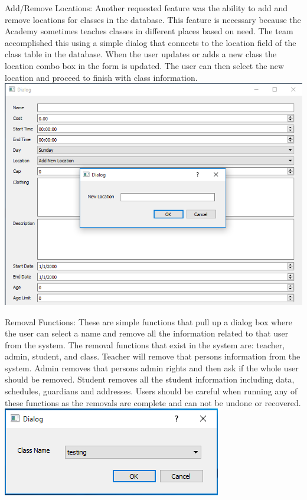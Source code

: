Add/Remove Locations:
Another requested feature was the ability to add and remove locations for classes in the database. This feature is necessary because the Academy sometimes teaches classes in different places based on need. The team accomplished this using a simple dialog that connects to the location field of the class table in the database. When the user updates or adds a new class the location combo box in the form is updated. The user can then select the new location and proceed to finish with class information.\\

\includegraphics[scale=0.5]{newLocation.png}

Removal Functions:
These are simple functions that pull up a dialog box where the user can select a name and remove all the information related to that user from the system. The removal functions that exist in the system are: teacher, admin, student, and class. Teacher will remove that persons information from the system. Admin removes that persons admin rights and then ask if the whole user should be removed. Student removes all the student information including data, schedules, guardians and addresses. Users should be careful when running any of these functions as the removals are complete and can not be undone or recovered.\\

\includegraphics[scale=0.5]{removal.png}

